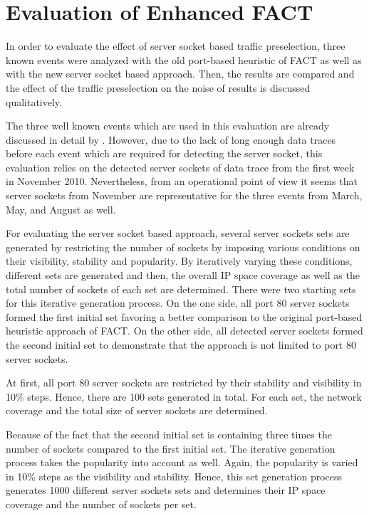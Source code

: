 \newpage
\section{Evaluation of Enhanced FACT\label{section:enhanced_FACT_eval}} 
In order to evaluate the effect of \gls{server socket} based traffic preselection, three known events were analyzed with the old port-based heuristic of \gls{FACT} as well as with the new \gls{server socket} based approach. 
Then, the results are compared and the effect of the traffic preselection on the noise of results is discussed qualitatively.

The three well known events which are used in this evaluation are already discussed in detail by \citet{SchatzmannPAM2011}. 
However, due to the lack of long enough data traces before each event which are required for detecting the \gls{server socket}, this evaluation relies on the detected \glspl{server socket} of data trace from the first week in November 2010. 
Nevertheless, from an operational point of view it seems that \glspl{server socket} from November are representative for the three events from March, May, and August as well.

For evaluating the \gls{server socket} based approach, several \glspl{server socket} sets are generated by restricting the number of sockets by imposing various conditions on their visibility, stability and popularity. 
By iteratively varying these conditions, different sets are generated and then, the overall IP space coverage as well as the total number of sockets of each set are determined. 
There were two starting sets for this iterative generation process. 
On the one side, all port 80 \glspl{server socket} formed the first initial set favoring a better comparison to the original port-based heuristic approach of FACT. 
On the other side, all detected \glspl{server socket} formed the second initial set to demonstrate that the approach is not limited to port 80 \glspl{server socket}. 

At first, all port 80 \glspl{server socket} are restricted by their stability and visibility in 10\% steps. Hence, there are 100 sets generated in total. 
For each set, the network coverage and the total size of \glspl{server socket} are determined. 

Because of the fact that the second initial set is containing three times the number of sockets compared to the first initial set.
The iterative generation process takes the popularity into account as well.
Again, the popularity is varied in 10\% steps as the visibility and stability. 
Hence, this set generation process generates 1000 different \glspl{server socket} sets and determines their IP space coverage and the number of sockets per set.

